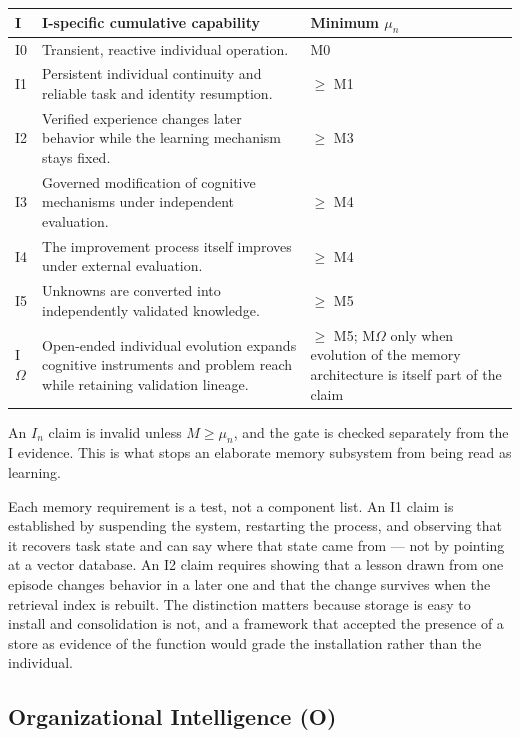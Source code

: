 \documentclass[11pt]{article}
\theoremstyle{definition}
\newcommand{\Om}{\ensuremath{\Omega}}
\begin{document}
\begin{table}[h]
\centering\small
\begin{tabularx}{\textwidth}{@{}lYl@{}}
\toprule
I & I-specific cumulative capability & Minimum $\mu_n$ \\
\midrule
I0 & Transient, reactive individual operation. & M0 \\
I1 & Persistent individual continuity and reliable task and identity resumption. & $\ge$ M1 \\
I2 & Verified experience changes later behavior while the learning mechanism stays fixed. & $\ge$ M3 \\
I3 & Governed modification of cognitive mechanisms under independent evaluation. & $\ge$ M4 \\
I4 & The improvement process itself improves under external evaluation. & $\ge$ M4 \\
I5 & Unknowns are converted into independently validated knowledge. & $\ge$ M5 \\
I\Om{} & Open-ended individual evolution expands cognitive instruments and problem reach while retaining validation lineage. & $\ge$ M5; M\Om{} only when evolution of the memory architecture is itself part of the claim \\
\bottomrule
\end{tabularx}
\end{table}

An $I_n$ claim is invalid unless $M \ge \mu_n$, and the gate is checked separately from the I evidence. This is what stops an elaborate memory subsystem from being read as learning.

Each memory requirement is a test, not a component list. An I1 claim is established by suspending the system, restarting the process, and observing that it recovers task state and can say where that state came from --- not by pointing at a vector database. An I2 claim requires showing that a lesson drawn from one episode changes behavior in a later one and that the change survives when the retrieval index is rebuilt. The distinction matters because storage is easy to install and consolidation is not, and a framework that accepted the presence of a store as evidence of the function would grade the installation rather than the individual.

\subsection{Organizational Intelligence (O)}
\end{document}
